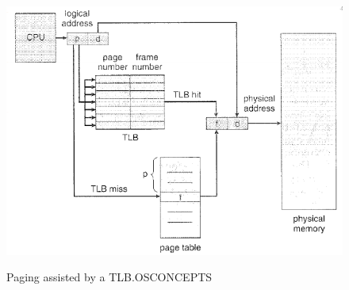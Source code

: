 \documentclass[10pt,a4paper]{article}
\begin{document}
\begin{figure}
\caption{Paging assisted by a TLB.{OSCONCEPTS}}
\begin{center}
\includegraphics[scale=0.45]{../images/page-tlb.png}
\label{page-tlb}
\end{center}
\end{figure}
\end{document}
